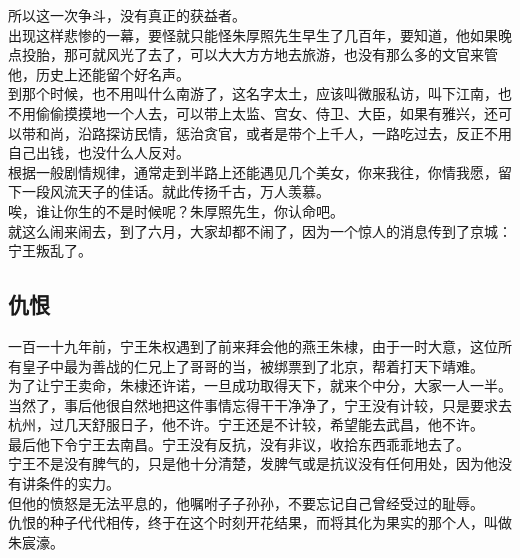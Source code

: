 \begin{multicols}{\theparacolNo}
所以这一次争斗，没有真正的获益者。\\

出现这样悲惨的一幕，要怪就只能怪朱厚照先生早生了几百年，要知道，他如果晚点投胎，那可就风光了去了，可以大大方方地去旅游，也没有那么多的文官来管他，历史上还能留个好名声。\\

到那个时候，也不用叫什么南游了，这名字太土，应该叫微服私访，叫下江南，也不用偷偷摸摸地一个人去，可以带上太监、宫女、侍卫、大臣，如果有雅兴，还可以带和尚，沿路探访民情，惩治贪官，或者是带个上千人，一路吃过去，反正不用自己出钱，也没什么人反对。\\

根据一般剧情规律，通常走到半路上还能遇见几个美女，你来我往，你情我愿，留下一段风流天子的佳话。就此传扬千古，万人羡慕。\\

唉，谁让你生的不是时候呢？朱厚照先生，你认命吧。\\

就这么闹来闹去，到了六月，大家却都不闹了，因为一个惊人的消息传到了京城：宁王叛乱了。\\

\subsection{仇恨}
一百一十九年前，宁王朱权遇到了前来拜会他的燕王朱棣，由于一时大意，这位所有皇子中最为善战的仁兄上了哥哥的当，被绑票到了北京，帮着打天下靖难。\\

为了让宁王卖命，朱棣还许诺，一旦成功取得天下，就来个中分，大家一人一半。\\

当然了，事后他很自然地把这件事情忘得干干净净了，宁王没有计较，只是要求去杭州，过几天舒服日子，他不许。宁王还是不计较，希望能去武昌，他不许。\\

最后他下令宁王去南昌。宁王没有反抗，没有非议，收拾东西乖乖地去了。\\

宁王不是没有脾气的，只是他十分清楚，发脾气或是抗议没有任何用处，因为他没有讲条件的实力。\\

但他的愤怒是无法平息的，他嘱咐子子孙孙，不要忘记自己曾经受过的耻辱。\\

仇恨的种子代代相传，终于在这个时刻开花结果，而将其化为果实的那个人，叫做朱宸濠。\\


\end{multicols}
